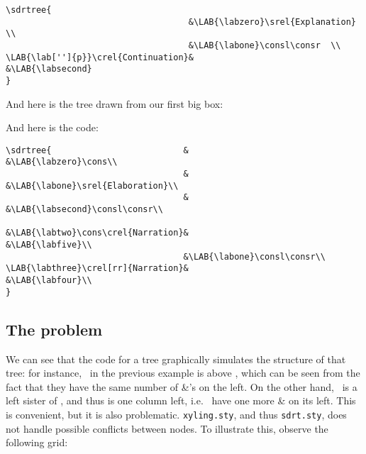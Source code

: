\documentclass[a4paper]{article}
\begin{document}
\begin{center}
\begin{verbatim}
\sdrtree{          
                                    &\LAB{\labzero}\srel{Explanation}  \\
                                    &\LAB{\labone}\consl\consr  \\
\LAB{\lab['']{p}}\crel{Continuation}&                                &\LAB{\labsecond}
}
\end{verbatim}
\end{center}
And here is the tree drawn from our first big box:
\begin{center}
\end{center}
And here is the code: 
\scriptsize
\begin{verbatim}
\sdrtree{                          &                                  &\LAB{\labzero}\cons\\
                                   &                                  &\LAB{\labone}\srel{Elaboration}\\
                                   &                                  &\LAB{\labsecond}\consl\consr\\
                                   &\LAB{\labtwo}\cons\crel{Narration}&                                  &\LAB{\labfive}\\
                                   &\LAB{\labone}\consl\consr\\
\LAB{\labthree}\crel[rr]{Narration}&                                  &\LAB{\labfour}\\
}
\end{verbatim}
\normalsize

\subsection{The problem}
We can see that the code for a tree graphically simulates the structure of that tree: for instance, \labzero\ in the previous example is above \labone, which can be seen from the fact that they have the same number of \&'s on the left. On the other hand, \labtwo\ is a left sister of \labsecond, and thus is one column left, i.e. \labsecond\ have one more \& on its left. This is convenient, but it is also problematic. \verb+xyling.sty+, and thus \verb+sdrt.sty+, does not handle possible conflicts between nodes. To illustrate this, observe the following grid:
\end{document}
